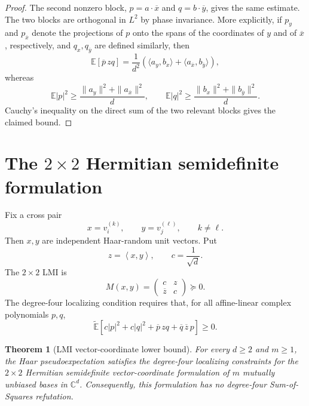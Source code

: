 \documentclass[11pt]{article}
\newtheorem{theorem}{Theorem}[section]
\theoremstyle{remark}
\newcommand{\C}{\mathbb{C}}
\newcommand{\E}{\mathbb{E}}
\newcommand{\Et}{\widetilde{\mathbb{E}}}
\newcommand{\ip}[2]{\left\langle #1,#2\right\rangle}
\begin{document}
\begin{proof}
The second nonzero block, $p=a\cdot\overline x$ and $q=b\cdot\overline y$, gives the same estimate. The two blocks are orthogonal in $L^2$ by phase invariance. More explicitly, if $p_y$ and $p_{\overline x}$ denote the projections of $p$ onto the spans of the coordinates of $y$ and of $\overline x$, respectively, and $q_x,q_{\overline y}$ are defined similarly, then
\[
\E[\overline p\,zq]
=
\frac1{d^2}
\left(\langle a_y,b_x\rangle+\langle a_{\overline x},b_{\overline y}\rangle\right),
\]
whereas
\[
\E|p|^2\ge \frac{\|a_y\|^2+\|a_{\overline x}\|^2}{d},
\qquad
\E|q|^2\ge \frac{\|b_x\|^2+\|b_{\overline y}\|^2}{d}.
\]
Cauchy's inequality on the direct sum of the two relevant blocks gives the claimed bound.
\end{proof}

\section{\texorpdfstring{The $2\times2$ Hermitian semidefinite formulation}{The 2x2 Hermitian semidefinite formulation}}

Fix a cross pair
\[
x=v_i^{(k)},
\qquad
y=v_j^{(\ell)},
\qquad
k\ne\ell.
\]
Then $x,y$ are independent Haar-random unit vectors. Put
\[
z=\ip{x}{y},
\qquad
c=\frac1{\sqrt d}.
\]
The $2\times2$ LMI is
\[
M(x,y)=
\begin{pmatrix}
c & z\\
\overline z & c
\end{pmatrix}
\succeq0.
\]
The degree-four localizing condition requires that, for all affine-linear complex polynomials $p,q$,
\[
\Et\left[
c|p|^2+c|q|^2+\overline p\,zq+\overline q\,\overline z\,p
\right]\ge0.
\]

\begin{theorem}[LMI vector-coordinate lower bound]\label{thm:lmi}
For every $d\ge2$ and $m\ge1$, the Haar pseudoexpectation satisfies the degree-four localizing constraints for the $2\times2$ Hermitian semidefinite vector-coordinate formulation of $m$ mutually unbiased bases in $\C^d$. Consequently, this formulation has no degree-four Sum-of-Squares refutation.
\end{theorem}
\end{document}
